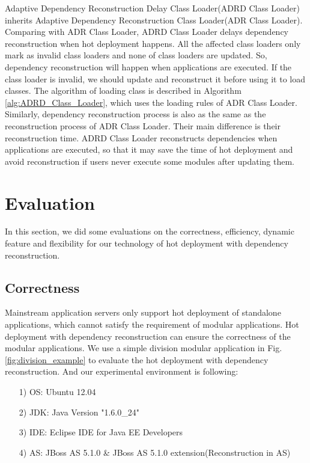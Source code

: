 \documentclass[conference]{IEEEtran}
\begin{document}
Adaptive Dependency Reconstruction Delay Class Loader(ADRD Class Loader) inherits Adaptive Dependency Reconstruction Class Loader(ADR Class Loader).
Comparing with ADR Class Loader, ADRD Class Loader delays dependency reconstruction when hot deployment happens.
All the affected class loaders only mark as invalid class loaders and none of class loaders are updated.
So, dependency reconstruction will happen when applications are executed.
If the class loader is invalid, we should update and reconstruct it before using it to load classes. 
The algorithm of loading class is described in Algorithm \ref{alg:ADRD_Class_Loader}, which uses the loading rules of ADR Class Loader.
Similarly, dependency reconstruction process is also as the same as the reconstruction process of ADR Class Loader.
Their main difference is their reconstruction time.
ADRD Class Loader reconstructs dependencies when applications are executed, so that it may save the time of hot deployment and avoid reconstruction if users never execute some modules after updating them.




\section{Evaluation\label{sec:evaluation}}
In this section, we did some evaluations on the correctness, efficiency, dynamic feature and flexibility for our technology of hot deployment with dependency reconstruction.

\subsection{Correctness}
Mainstream application servers only support hot deployment of standalone applications, which cannot satisfy the requirement of modular applications.
Hot deployment with dependency reconstruction can ensure the correctness of the modular applications.
We use a simple division modular application in Fig.\ref{fig:division_example} to evaluate the hot deployment with dependency reconstruction.
And our experimental environment is following:
\begin{itemize}[]
\item[1)] OS: Ubuntu 12.04
\item[2)] JDK: Java Version "1.6.0\_24"
\item[3)] IDE: Eclipse IDE for Java EE Developers
\item[4)] AS: JBoss AS 5.1.0 \& JBoss AS 5.1.0 extension(Reconstruction in AS)
\end{itemize}
\end{document}
